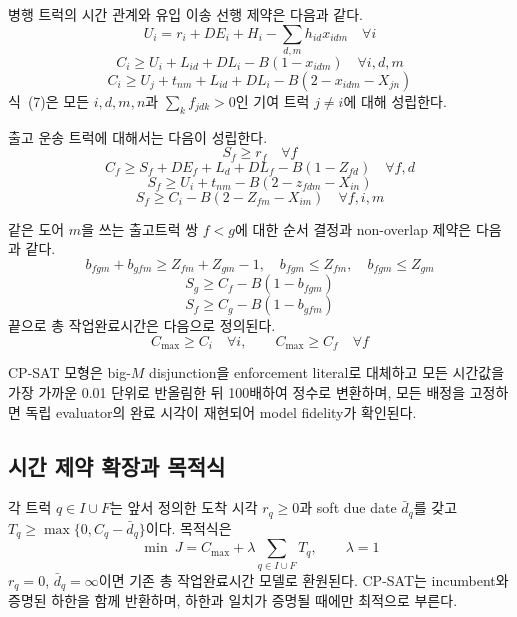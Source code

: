 \documentclass[10pt,a4paper]{article}
\begin{document}
병행 트럭의 시간 관계와 유입 이송 선행 제약은 다음과 같다.
\begin{equation}U_i=r_i+DE_i+H_i-\textstyle\sum_{d,m}h_{id}x_{idm}\quad\forall i\tag{5}\end{equation}
\begin{equation}C_i\ge U_i+L_{id}+DL_i-B(1-x_{idm})\quad\forall i,d,m\tag{6}\end{equation}
\begin{equation}C_i\ge U_j+t_{nm}+L_{id}+DL_i-B(2-x_{idm}-X_{jn})\tag{7}\end{equation}
식~(7)은 모든 $i,d,m,n$과 $\sum_k f_{jdk}>0$인 기여 트럭 $j\ne i$에 대해 성립한다.

출고 운송 트럭에 대해서는 다음이 성립한다.
\begin{equation}S_f\ge r_f\quad\forall f\tag{8}\end{equation}
\begin{equation}C_f\ge S_f+DE_f+L_d+DL_f-B(1-Z_{fd})\quad\forall f,d\tag{9}\end{equation}
\begin{equation}S_f\ge U_i+t_{nm}-B(2-z_{fdm}-X_{in})\tag{10}\end{equation}
\begin{equation}S_f\ge C_i-B(2-Z_{fm}-X_{im})\quad\forall f,i,m\tag{11}\end{equation}

같은 도어 $m$을 쓰는 출고트럭 쌍 $f<g$에 대한 순서 결정과 non-overlap 제약은
다음과 같다.
\begin{equation}b_{fgm}+b_{gfm}\ge Z_{fm}+Z_{gm}-1,\quad b_{fgm}\le Z_{fm},\quad b_{fgm}\le Z_{gm}\tag{12}\end{equation}
\begin{equation}S_g\ge C_f-B(1-b_{fgm})\tag{13}\end{equation}
\begin{equation}S_f\ge C_g-B(1-b_{gfm})\tag{14}\end{equation}
끝으로 총 작업완료시간은 다음으로 정의된다.
\begin{equation}C_{\max}\ge C_i\quad\forall i,\qquad C_{\max}\ge C_f\quad\forall f\tag{15}\end{equation}

CP-SAT 모형은
big-$M$ disjunction을 enforcement literal로 대체하고 모든 시간값을 가장 가까운
0.01 단위로 반올림한 뒤 100배하여 정수로 변환하며, 모든 배정을 고정하면 독립
evaluator의 완료 시각이 재현되어 model fidelity가 확인된다.

\subsection{시간 제약 확장과 목적식}
각 트럭 $q\in I\cup F$는 앞서 정의한 도착 시각 $r_q\ge0$과 soft due date $\bar d_q$를 갖고
$T_q\ge\max\{0,C_q-\bar d_q\}$이다. 목적식은
\begin{equation}\min\ J=C_{\max}+\lambda\sum_{q\in I\cup F}T_q,\qquad \lambda=1
\label{eq:obj}\tag{16}\end{equation}
$r_q=0$, $\bar d_q=\infty$이면 기존 총 작업완료시간 모델로 환원된다. CP-SAT는 incumbent와
증명된 하한을 함께 반환하며, 하한과 일치가 증명될 때에만 최적으로 부른다.
\end{document}
